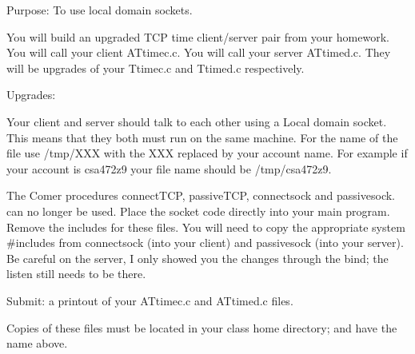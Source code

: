 

\parindent 0pt

Purpose: To use local domain sockets.

You will build an upgraded TCP time client/server pair
from your homework.
You will call your client {\ltt{}ATtimec.c}.
You will call your server {\ltt{}ATtimed.c}.
They will be upgrades of your {\ltt{}Ttimec.c} and {\ltt{}Ttimed.c}
respectively.

Upgrades:

Your client and server should talk to each other using a Local domain
socket.
This means that they both must run on the same machine.
For the name of the file use {\ltt{}/tmp/XXX} with the {\ltt{}XXX}
replaced by your account name. For example if your account
is {\ltt{}csa472z9} your file name should be {\ltt{}/tmp/csa472z9}.

The Comer procedures {\ltt{}connectTCP}, {\ltt{}passiveTCP},
{\ltt{}connectsock} and {\ltt{}passivesock}.
can no longer be used.
Place the socket code directly into your main program.
Remove the includes for these files.
You will need to copy the appropriate
system {\ltt{}#include}s from {\ltt{}connectsock} (into your client)
and {\ltt{}passivesock} (into your server).
Be careful on the server, I only showed you the changes through the
{\ltt{}bind}; the {\ltt{}listen} still needs to be there.

Submit: a printout of your {\ltt{}ATtimec.c} and {\ltt{}ATtimed.c} files.

Copies of these files must be located in your class home directory;
and have the name above.

\bye
